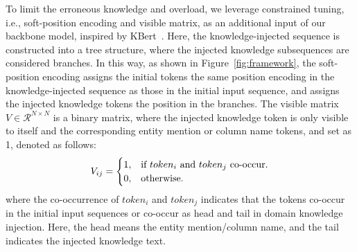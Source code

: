 To limit the erroneous knowledge and overload, we leverage constrained tuning, i.e., soft-position encoding and visible matrix, as an additional input of our backbone model, inspired by K\-Bert~\cite{liu_k-bert_2020}. Here, the knowledge-injected sequence is constructed into a tree structure, where the injected knowledge subsequences are considered branches. In this way, as shown in Figure~\ref{fig:framework}, the soft-position encoding assigns the initial tokens the same position encoding in the knowledge-injected sequence as those in the initial input sequence, and assigns the injected knowledge tokens the position in the branches. The visible matrix $V\in \mathcal{R}^{N \times N}$ is a binary matrix, where the injected knowledge token is only visible to itself and the corresponding entity mention or column name tokens, and set as 1, denoted as follows:
\begin{equation}
    V_{ij} = \begin{cases}
    1, & \text{if $token_i$ \text{and} $token_j$ co-occur}.\\
    0, & \text{otherwise}.
  \end{cases}
  \label{Eq:VM}
\end{equation}
where the co-occurrence of $token_i$ and $token_j$ indicates that the tokens co-occur in the initial input sequences or co-occur as head and tail in domain knowledge injection. Here, the head means the entity mention/column name, and the tail indicates the injected knowledge text. 
